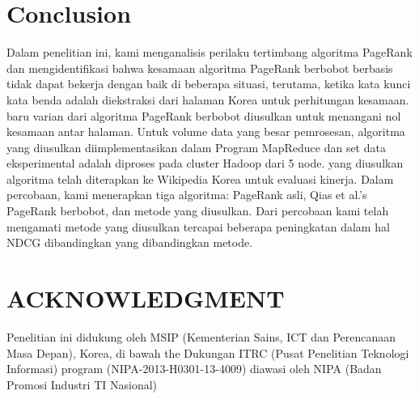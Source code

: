 \documentclass[conference]{IEEEtran}
\begin{document}
\section{Conclusion}
Dalam penelitian ini, kami menganalisis perilaku tertimbang
algoritma PageRank dan mengidentifikasi bahwa kesamaan
algoritma PageRank berbobot berbasis tidak dapat bekerja dengan baik di
beberapa situasi, terutama, ketika kata kunci kata benda adalah
diekstraksi dari halaman Korea untuk perhitungan kesamaan. baru
varian dari algoritma PageRank berbobot diusulkan untuk
menangani nol kesamaan antar halaman. Untuk volume data yang besar
pemrosesan, algoritma yang diusulkan diimplementasikan dalam
Program MapReduce dan set data eksperimental adalah
diproses pada cluster Hadoop dari 5 node. yang diusulkan
algoritma telah diterapkan ke Wikipedia Korea untuk
evaluasi kinerja. Dalam percobaan, kami menerapkan
tiga algoritma: PageRank asli, Qias et al.'s
PageRank berbobot\cite{qiao2010simrank}, dan metode yang diusulkan. Dari
percobaan kami telah mengamati metode yang diusulkan tercapai
beberapa peningkatan dalam hal NDCG dibandingkan yang dibandingkan
metode.

\section*{ACKNOWLEDGMENT}
Penelitian ini didukung oleh MSIP (Kementerian
Sains, ICT dan Perencanaan Masa Depan), Korea, di bawah the
Dukungan ITRC (Pusat Penelitian Teknologi Informasi)
program (NIPA-2013-H0301-13-4009) diawasi oleh
NIPA (Badan Promosi Industri TI Nasional)



\end{document}
